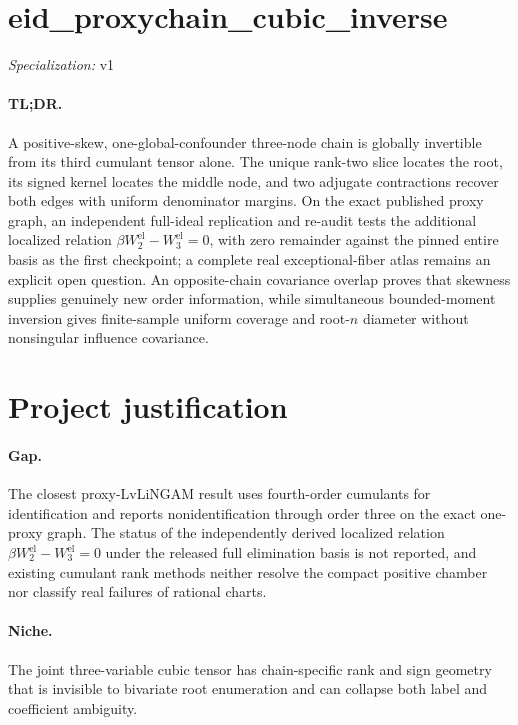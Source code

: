 \documentclass{article}
\begin{document}
\sloppy

\section*{eid\_\allowbreak{}proxychain\_\allowbreak{}cubic\_\allowbreak{}inverse}

\noindent\textit{Specialization:} v1\par

\paragraph{TL;DR.} A positive-skew, one-global-confounder three-node chain is globally invertible from its third cumulant tensor alone. The unique rank-two slice locates the root, its signed kernel locates the middle node, and two adjugate contractions recover both edges with uniform denominator margins. On the exact published proxy graph, an independent full-ideal replication and re-audit tests the additional localized relation \(\beta W_2^{\mathrm{el}}-W_3^{\mathrm{el}}=0\), with zero remainder against the pinned entire basis as the first checkpoint; a complete real exceptional-fiber atlas remains an explicit open question. An opposite-chain covariance overlap proves that skewness supplies genuinely new order information, while simultaneous bounded-moment inversion gives finite-sample uniform coverage and root-\(n\) diameter without nonsingular influence covariance.

\section{Project justification}

\paragraph{Gap.} The closest proxy-LvLiNGAM result uses fourth-order cumulants for identification and reports nonidentification through order three on the exact one-proxy graph. The status of the independently derived localized relation \(\beta W_2^{\mathrm{el}}-W_3^{\mathrm{el}}=0\) under the released full elimination basis is not reported, and existing cumulant rank methods neither resolve the compact positive chamber nor classify real failures of rational charts.

\paragraph{Niche.} The joint three-variable cubic tensor has chain-specific rank and sign geometry that is invisible to bivariate root enumeration and can collapse both label and coefficient ambiguity.
\end{document}
